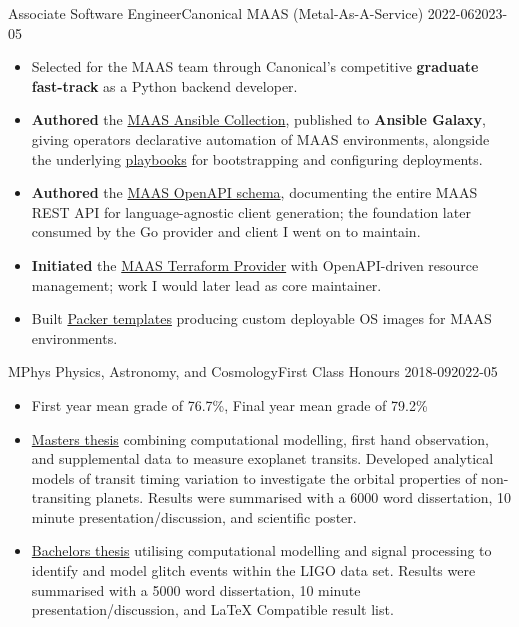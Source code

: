 {Associate Software Engineer}{Canonical MAAS (Metal-As-A-Service)}
{2022-06}{2023-05}
{%
\begin{itemize}[leftmargin=*, labelsep=-0.1em, noitemsep]
    \item Selected for the MAAS team through Canonical's competitive \textbf{graduate fast-track} as a Python backend developer.
    \item \textbf{Authored} the \href{https://github.com/canonical/ansible-collection}{MAAS Ansible Collection}, published to \textbf{Ansible Galaxy}, giving operators declarative automation of MAAS environments, alongside the underlying \href{https://github.com/maas/MAAS-ansible-playbook}{playbooks} for bootstrapping and configuring deployments.
    \item \textbf{Authored} the \href{https://maas.io/docs/api}{MAAS OpenAPI schema}, documenting the entire MAAS REST API for language-agnostic client generation; the foundation later consumed by the Go provider and client I went on to maintain.
    \item \textbf{Initiated} the \href{https://github.com/canonical/terraform-provider-maas}{MAAS Terraform Provider} with OpenAPI-driven resource management; work I would later lead as core maintainer.
    \item Built \href{https://github.com/canonical/packer-maas}{Packer templates} producing custom deployable OS images for MAAS environments.
\end{itemize}
}


{MPhys Physics, Astronomy, and Cosmology}{First Class Honours}
{2018-09}{2022-05}
{%
\begin{itemize}[leftmargin=*, labelsep=-0.1em, noitemsep]
    \item First year mean grade of 76.7\%, Final year mean grade of 79.2\%
    \item \href{https://skyecas.github.io/assets/pdf/TransitDissertation.pdf}{Masters thesis} combining computational modelling, first hand observation, and supplemental data to measure exoplanet transits. Developed analytical models of transit timing variation to investigate the orbital properties of non-transiting planets. Results were summarised with a 6000 word dissertation, 10 minute presentation/discussion, and scientific poster.
    \item \href{https://skyecas.github.io/assets/pdf/GWProjectFinalReport.pdf}{Bachelors thesis} utilising computational modelling and signal processing to identify and model glitch events within the LIGO data set. Results were summarised with a 5000 word dissertation, 10 minute presentation/discussion, and LaTeX Compatible result list.
\end{itemize}
}

